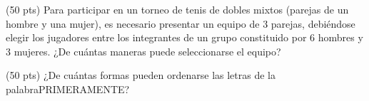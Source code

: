 \documentclass[a4paper,12pt,twoside,spanish]{amsbook}
\begin{document}

\begin{ejercicio}[1]
        (50 pts) Para participar en un torneo de tenis de dobles mixtos (parejas de un hombre y una mujer), es necesario presentar 
        un equipo de 3 parejas, debiéndose elegir los jugadores entre los integrantes de un grupo constituido por 6 hombres y 3 mujeres. 
         ¿De cuántas maneras puede seleccionarse el equipo?
		
        \end{ejercicio}
        
       \begin{ejercicio}[2] (50 pts) ¿De cuántas formas pueden ordenarse las letras de la palabra\newline PRIMERAMENTE?

\end{ejercicio}
	
\begin{comment}
\begin{solucion}
	\noindent 1. La pregunta del ejercicio es equivalente a ¿cuántas palabras de 1, 2,3 o 4 letras se pueden hacer con un alfabeto de 26 letras? Es decir podemos separar en 4 casos (disjuntos) palabras de 1 letra, de 2 letras,  de 3 letras  o de 4 letras. Cada caso  es una selección ordenada con repetición.
	
	\textbf{1 letra.} 26 palabras.
	
	\textbf{2 letras.} $26 \times 26 = 26^2$ palabras.
	
	\textbf{3 letras.} $26 \times 26 \times  26 = 26^3$ palabras.

	\textbf{4 letras.}  $26 \times 26 \times  26 \times  26 = 26^4$ palabras.
	
	Luego  la respuesta es $26 + 26^2 + 26^3 + 26^4$ palabras.
	
	\vskip .4cm
	
	\noindent 2. La palabra PREPOTENTE es una palabra de longitud 10, donde la E se repite 3 veces, la P y la T se repiten 2 veces y luego están  la R, la O y  la N  una sola vez cada una.
	
	Luego, la solución es
	$$
	\frac{10!}{3!2!2!}.
	$$
\end{solucion}

\end{comment}
\end{document}
